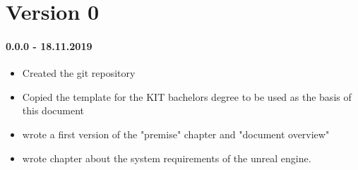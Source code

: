 
\section*{Version 0}

\paragraph{0.0.0 - 18.11.2019}

\begin{itemize}
\item Created the git repository
\item Copied the template for the KIT bachelors degree to be used as the basis of this document
\item wrote a first version of the "premise" chapter and "document overview"
\item wrote chapter about the system requirements of the unreal engine.
\end{itemize}